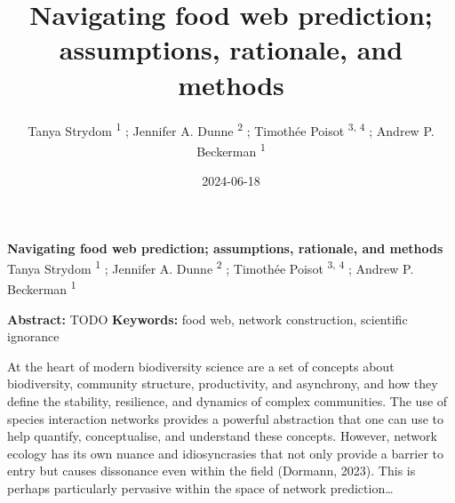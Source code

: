 \documentclass[
]{article}
\title{Navigating food web prediction; assumptions, rationale, and
methods}
\author{Tanya Strydom %
%
\textsuperscript{%
%
1%
}%
; Jennifer A. Dunne %
%
\textsuperscript{%
%
2%
}%
; Timothée Poisot %
%
\textsuperscript{%
3,%
4%
}%
; Andrew P. Beckerman %
%
\textsuperscript{%
%
1%
}%
}
\date{2024-06-18}
\begin{document}
\thispagestyle{empty}
{\bfseries\sffamily\Large Navigating food web prediction; assumptions,
rationale, and methods}
\vfil
Tanya Strydom %
%
\textsuperscript{%
%
1%
}%
; Jennifer A. Dunne %
%
\textsuperscript{%
%
2%
}%
; Timothée Poisot %
%
\textsuperscript{%
3,%
4%
}%
; Andrew P. Beckerman %
%
\textsuperscript{%
%
1%
}%

\vfil
{\small
\textbf{Abstract:} TODO
\vfil
\textbf{Keywords:} %
food web, network construction, %
scientific ignorance%
}
\clearpage
\setcounter{page}{1}
\doublespacing
\linenumbers

At the heart of modern biodiversity science are a set of concepts about
biodiversity, community structure, productivity, and asynchrony, and how
they define the stability, resilience, and dynamics of complex
communities. The use of species interaction networks provides a powerful
abstraction that one can use to help quantify, conceptualise, and
understand these concepts. However, network ecology has its own nuance
and idiosyncrasies that not only provide a barrier to entry but causes
dissonance even within the field (Dormann, 2023). This is perhaps
particularly pervasive within the space of network prediction\ldots{}
\end{document}
